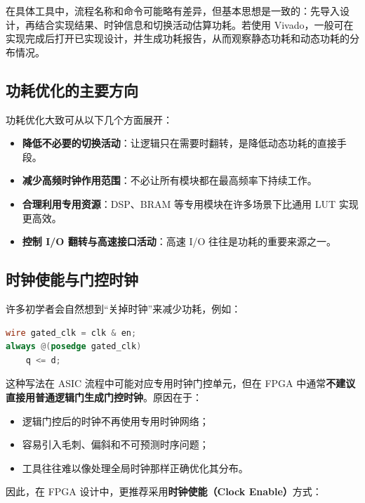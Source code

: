 在具体工具中，流程名称和命令可能略有差异，但基本思想是一致的：先导入设计，再结合实现结果、时钟信息和切换活动估算功耗。若使用
Vivado，一般可在实现完成后打开已实现设计，并生成功耗报告，从而观察静态功耗和动态功耗的分布情况。

\subsection{功耗优化的主要方向}\label{ux529fux8017ux4f18ux5316ux7684ux4e3bux8981ux65b9ux5411}

功耗优化大致可从以下几个方面展开：

\begin{itemize}
\tightlist
\item
  \textbf{降低不必要的切换活动}：让逻辑只在需要时翻转，是降低动态功耗的直接手段。
\item
  \textbf{减少高频时钟作用范围}：不必让所有模块都在最高频率下持续工作。
\item
  \textbf{合理利用专用资源}：DSP、BRAM 等专用模块在许多场景下比通用 LUT
  实现更高效。
\item
  \textbf{控制 I/O 翻转与高速接口活动}：高速 I/O
  往往是功耗的重要来源之一。
\end{itemize}

\subsection{时钟使能与门控时钟}\label{ux65f6ux949fux4f7fux80fdux4e0eux95e8ux63a7ux65f6ux949f}

许多初学者会自然想到``关掉时钟''来减少功耗，例如：

\begin{lstlisting}[language=Verilog]
wire gated_clk = clk & en;
always @(posedge gated_clk)
    q <= d;
\end{lstlisting}

这种写法在 ASIC 流程中可能对应专用时钟门控单元，但在 FPGA
中通常\textbf{不建议直接用普通逻辑门生成门控时钟}。原因在于：

\begin{itemize}
\tightlist
\item
  逻辑门控后的时钟不再使用专用时钟网络；
\item
  容易引入毛刺、偏斜和不可预测时序问题；
\item
  工具往往难以像处理全局时钟那样正确优化其分布。
\end{itemize}

因此，在 FPGA 设计中，更推荐采用\textbf{时钟使能（Clock Enable）}方式：

